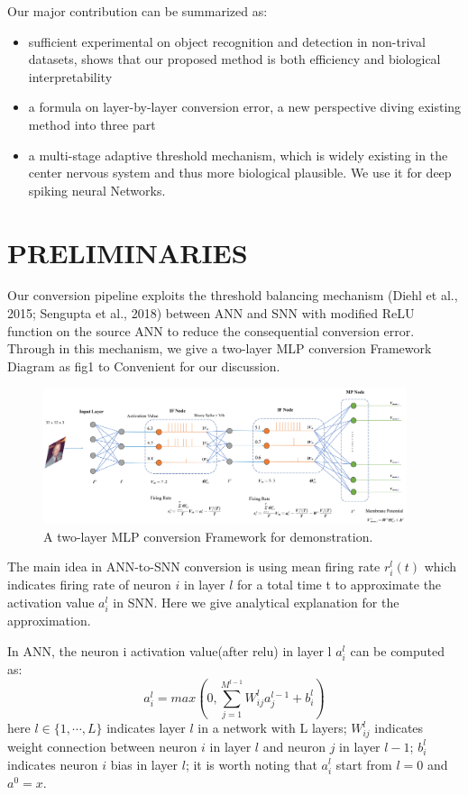 \documentclass{article}
\begin{document}
Our major contribution can be summarized as:
\begin{itemize}
  \item sufficient experimental on object recognition and detection in non-trival datasets, shows that our proposed method is both efficiency and biological interpretability
  \item a formula on layer-by-layer conversion error, a new perspective diving existing method into three part 
  \item a multi-stage adaptive threshold mechanism, which is widely existing in the center nervous system and thus more biological plausible. We use it for deep spiking neural Networks.
\end{itemize}


\section{PRELIMINARIES}
Our conversion pipeline exploits the threshold balancing mechanism (Diehl et al., 2015; Sengupta
et al., 2018) between ANN and SNN with modified ReLU function on the source ANN to reduce
the consequential conversion error. Through in this mechanism, we give a two-layer MLP conversion Framework 
Diagram as fig1 to Convenient for our discussion.

\begin{figure}[htbp]
  \centering
  \includegraphics[width=0.95\textwidth]{t.pdf}
  \caption{A two-layer MLP conversion Framework for demonstration.}
\end{figure}

The main idea in ANN-to-SNN conversion is using mean firing rate $r_i^l(t)$ which indicates firing rate of neuron $i$ in layer $l$ for a total time t to approximate the activation value $a_i^l$ in SNN.
Here we give analytical explanation for the approximation.

In ANN, the neuron i activation value(after relu) in layer l $a_i^l$ can be computed as:
\begin{equation}
  a_i^l = max\left(0, \sum_{j=1}^{M^{l-1}}W_{ij}^la_j^{l-1} + b_i^l\right)
\end{equation}
here $l \in \{1, \cdots ,L\}$ indicates layer $l$ in a network with L layers; $W_{ij}^l$ indicates weight connection between neuron $i$ in layer $l$ and neuron $j$ in layer $l-1$;
$b_i^l$ indicates neuron $i$ bias in layer $l$; it is worth noting that $a_i^l$ start from $l=0$ and $a^0=x$.
\end{document}
